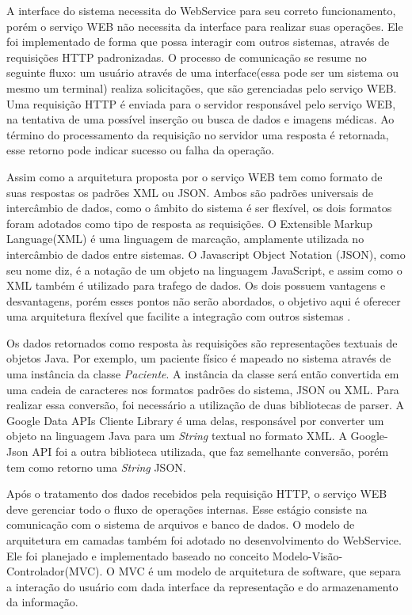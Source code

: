 A interface do sistema necessita do WebService para seu correto funcionamento, porém o serviço WEB não necessita da interface para realizar suas operações. Ele foi implementado de forma que possa interagir com outros sistemas, através de requisições HTTP padronizadas.
O processo de comunicação se resume no seguinte fluxo: um usuário através de uma interface(essa pode ser um sistema ou mesmo um terminal) realiza solicitações, que são gerenciadas pelo serviço WEB.
Uma requisição HTTP é enviada para o servidor responsável pelo serviço WEB, na tentativa de uma possível inserção ou busca de dados e imagens médicas.
Ao término do processamento da requisição no servidor uma resposta é retornada, esse retorno pode indicar sucesso ou falha da operação.

Assim como a arquitetura proposta por \cite{REF10} o serviço WEB tem como formato de suas respostas os padrões XML ou JSON.
Ambos são padrões universais de intercâmbio de dados, como o âmbito do sistema é ser flexível, os dois formatos foram adotados como tipo de resposta as requisições.
O Extensible Markup Language(XML) é uma linguagem de marcação, amplamente utilizada no intercâmbio de dados entre sistemas.
O Javascript Object Notation (JSON), como seu nome diz, é a notação de um objeto na linguagem JavaScript, e assim como o XML também é utilizado para trafego de dados.
Os dois possuem vantagens e desvantagens, porém esses pontos não serão abordados, o objetivo aqui é oferecer uma arquitetura flexível que facilite a integração com outros sistemas \cite{REF18}.

Os dados retornados como resposta às requisições são representações textuais de objetos Java.
Por exemplo, um paciente físico é mapeado no sistema através de uma instância da classe \textit{Paciente}.
A instância da classe será então convertida em uma cadeia de caracteres nos formatos padrões do sistema, JSON ou XML.
Para realizar essa conversão, foi necessário a utilização de duas bibliotecas de parser.
A Google Data APIs Cliente Library é uma delas, responsável por converter um objeto na linguagem Java para um \textit{String} textual no formato XML.
A Google-Json API foi a outra biblioteca utilizada, que faz semelhante conversão, porém tem como retorno uma \textit{String} JSON.

Após o tratamento dos dados recebidos pela requisição HTTP, o serviço WEB deve gerenciar todo o fluxo de operações internas. Esse estágio consiste na comunicação com o sistema de arquivos e banco de dados.
O modelo de arquitetura em camadas também foi adotado no desenvolvimento do WebService. Ele foi planejado e implementado baseado no conceito Modelo-Visão-Controlador(MVC).
O MVC é um modelo de arquitetura de software, que separa a interação do usuário com dada interface da representação e do armazenamento da informação.

